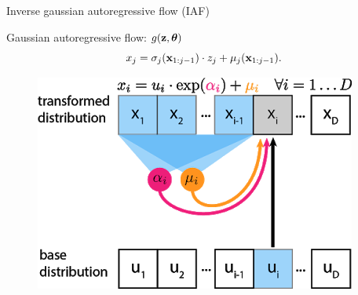 \begin{frame}{Inverse gaussian autoregressive flow (IAF)}
	
	\begin{minipage}[t]{0.65\columnwidth}
		\begin{block}{Gaussian autoregressive flow: $g(\mathbf{z}, \boldsymbol{\theta})$}
			\[
			x_j = \sigma_j (\mathbf{x}_{1:j-1}) \cdot z_j + \mu_j(\mathbf{x}_{1:j-1}).
			\]
		\end{block}
	\end{minipage}%
	\begin{minipage}[t]{0.35\columnwidth}
		\begin{figure}[h]
			\centering
			\includegraphics[width=.9\linewidth]{figs/af_iaf_explained_1.png}
		\end{figure}
	\end{minipage} \\
	

\end{frame}
